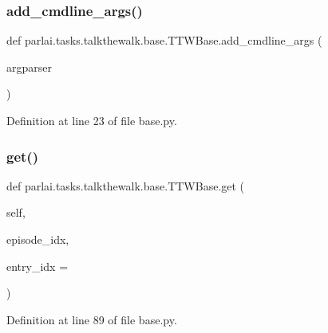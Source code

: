 \subsubsection{\texorpdfstring{add\+\_\+cmdline\+\_\+args()}{add\_cmdline\_args()}}
{\footnotesize\ttfamily def parlai.\+tasks.\+talkthewalk.\+base.\+T\+T\+W\+Base.\+add\+\_\+cmdline\+\_\+args (\begin{DoxyParamCaption}\item[{}]{argparser }\end{DoxyParamCaption})\hspace{0.3cm}{\ttfamily [static]}}



Definition at line 23 of file base.\+py.

\mbox{\label{classparlai_1_1tasks_1_1talkthewalk_1_1base_1_1TTWBase_adda57628371cdbb1afef6f297dab7c54}} 
\subsubsection{\texorpdfstring{get()}{get()}}
{\footnotesize\ttfamily def parlai.\+tasks.\+talkthewalk.\+base.\+T\+T\+W\+Base.\+get (\begin{DoxyParamCaption}\item[{}]{self,  }\item[{}]{episode\+\_\+idx,  }\item[{}]{entry\+\_\+idx = {} }\end{DoxyParamCaption})}



Definition at line 89 of file base.\+py.



